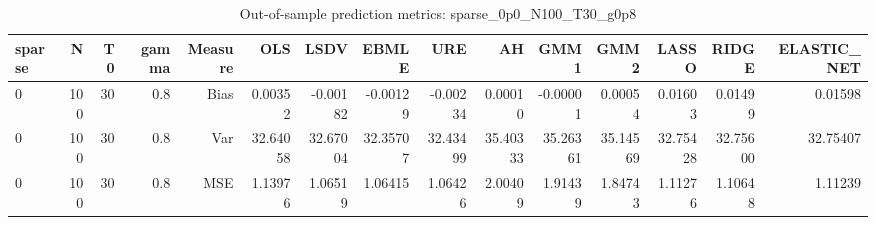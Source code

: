 \begin{table}[!htbp]\centering
\caption{Out-of-sample prediction metrics: sparse_0p0_N100_T30_g0p8}
\label{tab:table3_sparse_0p0_N100_T30_g0p8}
\begin{tabular}{lrrrrrrrrrrrrrr}
\hline
sparse & N & T0 & gamma & Measure & OLS & LSDV & EBMLE & URE & AH & GMM1 & GMM2 & LASSO & RIDGE & ELASTIC_NET \\
\hline
0 & 100 & 30 & 0.8 & Bias & 0.00352 & -0.00182 & -0.00129 & -0.00234 & 0.00010 & -0.00001 & 0.00054 & 0.01603 & 0.01499 & 0.01598 \\
0 & 100 & 30 & 0.8 & Var & 32.64058 & 32.67004 & 32.35707 & 32.43499 & 35.40333 & 35.26361 & 35.14569 & 32.75428 & 32.75600 & 32.75407 \\
0 & 100 & 30 & 0.8 & MSE & 1.13976 & 1.06519 & 1.06415 & 1.06426 & 2.00409 & 1.91439 & 1.84743 & 1.11276 & 1.10648 & 1.11239 \\
\hline
\end{tabular}
\end{table}

